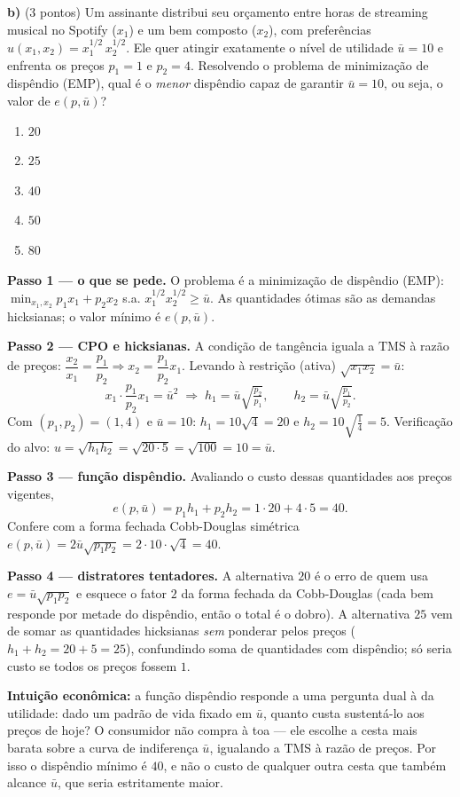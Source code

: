 \textbf{b)} (3 pontos) Um assinante distribui seu orçamento entre horas de streaming musical no Spotify ($x_1$) e um bem composto ($x_2$), com preferências $u(x_1,x_2)=x_1^{1/2}\,x_2^{1/2}$. Ele quer atingir exatamente o nível de utilidade $\bar u=10$ e enfrenta os preços $p_1=1$ e $p_2=4$. Resolvendo o problema de minimização de dispêndio (EMP), qual é o \emph{menor} dispêndio capaz de garantir $\bar u=10$, ou seja, o valor de $e(p,\bar u)$?

\begin{enumerate}[label=\Alph*., leftmargin=3.2em, itemsep=0.15em, topsep=0.2em]
  \item $20$
  \item $25$
  \item $40$
  \item $50$
  \item $80$
\end{enumerate}
\begin{solucao}
\textbf{Passo 1 — o que se pede.} O problema é a minimização de dispêndio (EMP): $\min_{x_1,x_2} p_1 x_1+p_2 x_2$ s.a. $x_1^{1/2}x_2^{1/2}\ge\bar u$. As quantidades ótimas são as demandas hicksianas; o valor mínimo é $e(p,\bar u)$.

\textbf{Passo 2 — CPO e hicksianas.} A condição de tangência iguala a $\text{TMS}$ à razão de preços: $\dfrac{x_2}{x_1}=\dfrac{p_1}{p_2}\Rightarrow x_2=\dfrac{p_1}{p_2}x_1$. Levando à restrição (ativa) $\sqrt{x_1 x_2}=\bar u$:
\[
x_1\cdot\frac{p_1}{p_2}x_1=\bar u^2\;\Rightarrow\; h_1=\bar u\sqrt{\tfrac{p_2}{p_1}},\qquad h_2=\bar u\sqrt{\tfrac{p_1}{p_2}}.
\]
Com $(p_1,p_2)=(1,4)$ e $\bar u=10$: $h_1=10\sqrt{4}=20$ e $h_2=10\sqrt{\tfrac14}=5$. Verificação do alvo: $u=\sqrt{h_1 h_2}=\sqrt{20\cdot 5}=\sqrt{100}=10=\bar u.$

\textbf{Passo 3 — função dispêndio.} Avaliando o custo dessas quantidades aos preços vigentes,
\[
e(p,\bar u)=p_1 h_1+p_2 h_2=1\cdot 20+4\cdot 5=40.
\]
Confere com a forma fechada Cobb-Douglas simétrica $e(p,\bar u)=2\bar u\sqrt{p_1 p_2}=2\cdot 10\cdot\sqrt{4}=40.$

\textbf{Passo 4 — distratores tentadores.} A alternativa $20$ é o erro de quem usa $e=\bar u\sqrt{p_1 p_2}$ e esquece o fator $2$ da forma fechada da Cobb-Douglas (cada bem responde por metade do dispêndio, então o total é o dobro). A alternativa $25$ vem de somar as quantidades hicksianas \emph{sem} ponderar pelos preços ($h_1+h_2=20+5=25$), confundindo soma de quantidades com dispêndio; só seria custo se todos os preços fossem $1$.

\textbf{Intuição econômica:} a função dispêndio responde a uma pergunta dual à da utilidade: dado um padrão de vida fixado em $\bar u$, quanto custa sustentá-lo aos preços de hoje? O consumidor não compra à toa — ele escolhe a cesta mais barata sobre a curva de indiferença $\bar u$, igualando a $\text{TMS}$ à razão de preços. Por isso o dispêndio mínimo é $40$, e não o custo de qualquer outra cesta que também alcance $\bar u$, que seria estritamente maior.
\end{solucao}

